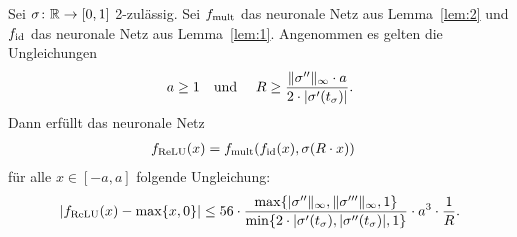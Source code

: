   \begin{lem}
  \label{lem:3}
  Sei $\sigma\colon \mathbb{R} \to [0, 1]$ 2-zulässig. Sei $f_{\mathrm{mult}}$ das neuronale Netz aus Lemma~\ref{lem:2} und $f_{\mathrm{id}}$ das neuronale Netz aus Lemma~\ref{lem:1}. Angenommen es gelten die Ungleichungen 
\begin{equation}
\label{lem:3:Vor1}   
  a \geq 1 \text{\quad und \quad} R \geq \frac{\|\sigma''\|_{\infty} \cdot a}{2 \cdot |\sigma'(t_{\sigma})|}.
\end{equation}
  Dann erfüllt das neuronale Netz 
  \begin{equation}
  \label{lem:3:Vor2}
  \begin{split}
  f_{\mathrm{ReLU}}(x) & = f_{\mathrm{mult}}(f_{\mathrm{id}}(x), \sigma(R \cdot x)) 
  \end{split}
  \end{equation}
 für alle $x \in [-a, a]$ folgende Ungleichung:
 $$|f_{\mathrm{ReLU}}(x) - \max\{x, 0\}| \leq 56 \cdot \frac{\max\{|\sigma''\|_{\infty}, \|\sigma'''\|_{\infty}, 1\}}{\min\{2 \cdot |\sigma'(t_{\sigma}), |\sigma''(t_{\sigma})|, 1\}} \cdot a^3 \cdot \frac{1}{R}.$$
  \end{lem}
